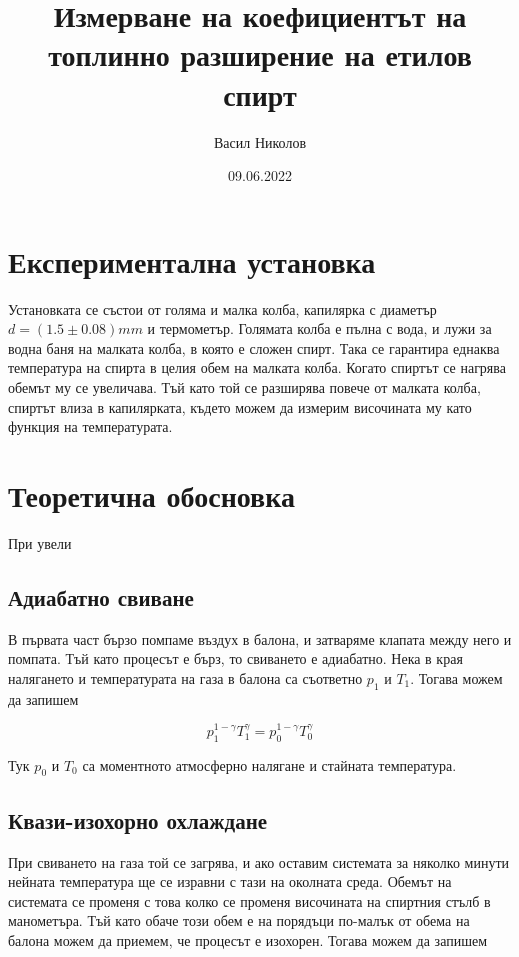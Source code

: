 \documentclass[%
 reprint,
 amsmath,amssymb,
 aps,
]{revtex4-2}
\begin{document}
\setlength{\abovedisplayskip}{3pt}
\setlength{\belowdisplayskip}{3pt}    

\title{Измерване на коефициентът на топлинно разширение на етилов спирт}
\author{Васил Николов}
\date{09.06.2022}
\maketitle
\section{Експериментална установка}

Установката се състои от голяма и малка колба, капилярка с диаметър $d = (1.5 \pm 0.08) \si{mm}$ и термометър. Голямата колба е пълна с вода, и лужи за водна баня на малката колба, в която е сложен спирт. Така се гарантира еднаква температура на спирта в целия обем на малката колба. Когато спиртът се нагрява обемът му се увеличава. Тъй като той се разширява повече от малката колба, спиртът влиза в капилярката, където можем да измерим височината му като функция на температурата.

\section{Теоретична обосновка}

При увели

\subsection{Адиабатно свиване}

В първата част бързо помпаме въздух в балона, и затваряме клапата между него и помпата. Тъй като процесът е бърз, то свиването е адиабатно. Нека в края налягането и температурата на газа в балона са съответно $p_1$ и $T_1$. Тогава можем да запишем

\begin{equation*}
    p_1^{1-\gamma} T_1^{\gamma} = p_0^{1 - \gamma} T_0^{\gamma}
\end{equation*}

Тук $p_0$ и $T_0$ са моментното атмосферно налягане и стайната температура.

\subsection{Квази-изохорно охлаждане}
При свиването на газа той се загрява, и ако оставим системата за няколко минути нейната температура ще се изравни с тази на околната среда. Обемът на системата се променя с това колко се променя височината на спиртния стълб в манометъра. Тъй като обаче този обем е на порядъци по-малък от обема на балона можем да приемем, че процесът е изохорен. Тогава можем да запишем
\end{document}
